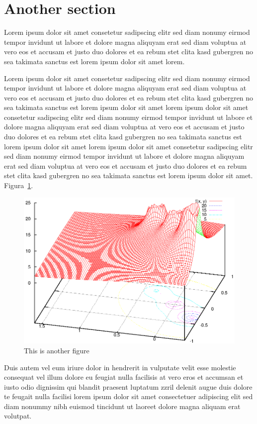 \section*{Another section}

Lorem ipsum dolor sit amet consetetur sadipscing elitr sed diam
nonumy eirmod tempor invidunt ut labore et dolore magna aliquyam
erat sed diam voluptua at vero eos et accusam et justo duo dolores
et ea rebum stet clita kasd gubergren no sea takimata sanctus est
lorem ipsum dolor sit amet lorem.~\cite{XIAOAPL05}

Lorem ipsum dolor sit amet consetetur sadipscing elitr sed diam
nonumy eirmod tempor invidunt ut labore et dolore magna aliquyam
erat sed diam voluptua at vero eos et accusam et justo duo dolores
et ea rebum stet clita kasd gubergren no sea takimata sanctus est
lorem ipsum dolor sit amet lorem ipsum dolor sit amet consetetur
sadipscing elitr sed diam nonumy eirmod tempor invidunt ut labore
et dolore magna aliquyam erat sed diam voluptua at vero eos et
accusam et justo duo dolores et ea rebum stet clita kasd gubergren
no sea takimata sanctus est lorem ipsum dolor sit amet lorem ipsum
dolor sit amet consetetur sadipscing elitr sed diam nonumy eirmod
tempor invidunt ut labore et dolore magna aliquyam erat sed diam
voluptua at vero eos et accusam et justo duo dolores et ea rebum
stet clita kasd gubergren no sea takimata sanctus est lorem ipsum
dolor sit amet. Figura~\ref{fig:fig2}.

\begin{figure}[htb]
\centering\includegraphics[width=.75\textwidth]{document/figures/exemplo1.eps}
\caption{\label{fig:fig2}This is another figure}
\end{figure}

Duis autem vel eum iriure dolor in hendrerit in vulputate velit
esse molestie consequat vel illum dolore eu feugiat nulla
facilisis at vero eros et accumsan et iusto odio dignissim qui
blandit praesent luptatum zzril delenit augue duis dolore te
feugait nulla facilisi lorem ipsum dolor sit amet consectetuer
adipiscing elit sed diam nonummy nibh euismod tincidunt ut laoreet
dolore magna aliquam erat volutpat.

